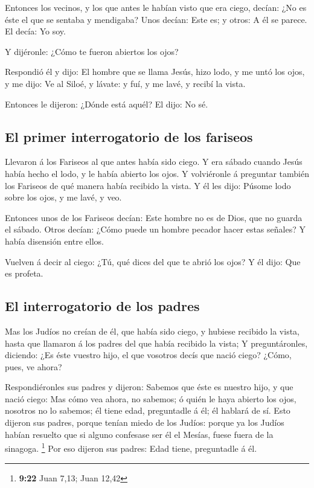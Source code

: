  Entonces los vecinos, y los que antes le habían visto que
era ciego, decían: ¿No es éste el que se sentaba y mendigaba?
 Unos decían: Este es; y otros: A él se parece. El decía:
Yo soy.

 Y dijéronle: ¿Cómo te fueron abiertos los ojos?

 Respondió él y dijo: El hombre que se llama Jesús, hizo
lodo, y me untó los ojos, y me dijo: Ve al Siloé, y lávate: y fuí, y me
lavé, y recibí la vista.

 Entonces le dijeron: ¿Dónde está aquél? El dijo: No sé.

\hypertarget{el-primer-interrogatorio-de-los-fariseos}{%
\subsection{El primer interrogatorio de los
fariseos}\label{el-primer-interrogatorio-de-los-fariseos}}

 Llevaron á los Fariseos al que antes había sido ciego.
 Y era sábado cuando Jesús había hecho el lodo, y le
había abierto los ojos.  Y volviéronle á preguntar
también los Fariseos de qué manera había recibido la vista. Y él les
dijo: Púsome lodo sobre los ojos, y me lavé, y veo.

 Entonces unos de los Fariseos decían: Este hombre no es
de Dios, que no guarda el sábado. Otros decían: ¿Cómo puede un hombre
pecador hacer estas señales? Y había disensión entre ellos.

 Vuelven á decir al ciego: ¿Tú, qué dices del que te
abrió los ojos? Y él dijo: Que es profeta.

\hypertarget{el-interrogatorio-de-los-padres}{%
\subsection{El interrogatorio de los
padres}\label{el-interrogatorio-de-los-padres}}

 Mas los Judíos no creían de él, que había sido ciego, y
hubiese recibido la vista, hasta que llamaron á los padres del que había
recibido la vista;  Y preguntáronles, diciendo: ¿Es éste
vuestro hijo, el que vosotros decís que nació ciego? ¿Cómo, pues, ve
ahora?

 Respondiéronles sus padres y dijeron: Sabemos que éste
es nuestro hijo, y que nació ciego:  Mas cómo vea ahora,
no sabemos; ó quién le haya abierto los ojos, nosotros no lo sabemos; él
tiene edad, preguntadle á él; él hablará de sí.  Esto
dijeron sus padres, porque tenían miedo de los Judíos: porque ya los
Judíos habían resuelto que si alguno confesase ser él el Mesías, fuese
fuera de la sinagoga. \footnote{\textbf{9:22} Juan 7,13; Juan 12,42}
 Por eso dijeron sus padres: Edad tiene, preguntadle á
él.

